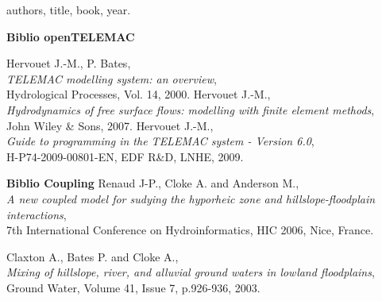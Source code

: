 
\pagebreak


\begin{thebibliography}{99}

 authors, title, book, year.

\vspace{0.5cm}
{\bf Biblio openTELEMAC}

  {\sc Hervouet J.-M., P. Bates},\\
 {\em TELEMAC modelling system: an overview},\\
Hydrological Processes, Vol. 14, 2000.
% 
  {\sc Hervouet J.-M.},\\
 {\em Hydrodynamics of free surface flows: modelling with finite element methods},\\
John Wiley \& Sons, 2007.
% 
  {\sc Hervouet J.-M.},\\
 {\em Guide to programming in the TELEMAC system - Version 6.0},\\
H-P74-2009-00801-EN, EDF R\&D, LNHE, 2009.

\vspace{0.5cm} {\bf Biblio Coupling}
% 
  {\sc Renaud J-P., Cloke A. and Anderson M.},\\
 {\em A new coupled model for sudying the hyporheic zone and hillslope-floodplain interactions},\\
7th International Conference on Hydroinformatics, HIC 2006, Nice, France.

  {\sc Claxton A., Bates P. and Cloke A.},\\
 {\em Mixing of hillslope, river, and alluvial ground waters in lowland floodplains},\\
Ground Water, Volume 41, Issue 7, p.926-936, 2003.

% 
\end{thebibliography}
